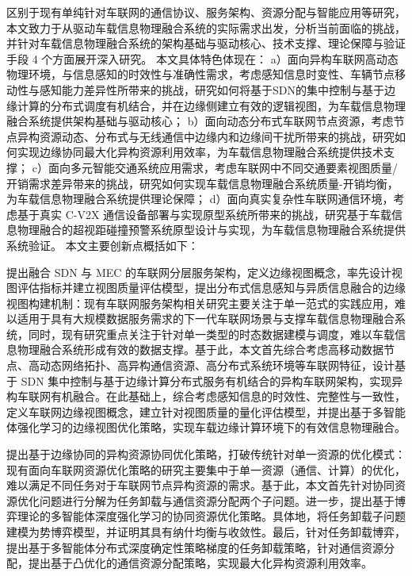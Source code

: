 区别于现有单纯针对车联网的通信协议、服务架构、资源分配与智能应用等研究，本文致力于从驱动车载信息物理融合系统的实际需求出发，分析当前面临的挑战，并针对车载信息物理融合系统的架构基础与驱动核心、技术支撑、理论保障与验证手段 4 个方面展开深入研究。
本文具体特色体现在：
a）面向异构车联网高动态物理环境，与信息感知的时效性与准确性需求，考虑感知信息时变性、车辆节点移动性与感知能力差异性所带来的挑战，研究如何将基于SDN的集中控制与基于边缘计算的分布式调度有机结合，并在边缘侧建立有效的逻辑视图，为车载信息物理融合系统提供架构基础与驱动核心；
b）面向动态分布式车联网节点资源，考虑节点异构资源动态、分布式与无线通信中边缘内和边缘间干扰所带来的挑战，研究如何实现边缘协同最大化异构资源利用效率，为车载信息物理融合系统提供技术支撑；
c）面向多元智能交通系统应用需求，考虑车联网中不同交通要素视图质量/开销需求差异带来的挑战，研究如何实现车载信息物理融合系统质量-开销均衡，为车载信息物理融合系统提供理论保障；
d）面向真实复杂性车联网通信环境，考虑基于真实 C-V2X 通信设备部署与实现原型系统所带来的挑战，研究基于车载信息物理融合的超视距碰撞预警系统原型设计与实现，为车载信息物理融合系统提供系统验证。
本文主要创新点概括如下：

 提出融合 SDN 与 MEC 的车联网分层服务架构，定义边缘视图概念，率先设计视图评估指标并建立视图质量评估模型，提出分布式信息感知与异质信息融合的边缘视图构建机制：现有车联网服务架构相关研究主要关注于单一范式的实践应用，难以适用于具有大规模数据服务需求的下一代车联网场景与支撑车载信息物理融合系统，同时，现有研究重点关注于针对单一类型的时态数据建模与调度，难以车载信息物理融合系统形成有效的数据支撑。基于此，本文首先综合考虑高移动数据节点、高动态网络拓扑、高异构通信资源、高分布式系统环境等车联网特征，设计基于 SDN 集中控制与基于边缘计算分布式服务有机结合的异构车联网架构，实现异构车联网有机融合。在此基础上，综合考虑感知信息的时效性、完整性与一致性，定义车联网边缘视图概念，建立针对视图质量的量化评估模型，并提出基于多智能体强化学习的边缘视图优化策略，实现车载边缘计算环境下的有效信息物理融合。


 提出基于边缘协同的异构资源协同优化策略，打破传统针对单一资源的优化模式：现有面向车联网资源优化策略的研究主要集中于单一资源（通信、计算）的优化，难以满足不同任务对于车联网节点异构资源的需求。基于此，本文首先针对协同资源优化问题进行分解为任务卸载与通信资源分配两个子问题。进一步，提出基于博弈理论的多智能体深度强化学习的协同资源优化策略。具体地，将任务卸载子问题建模为势博弈模型，并证明其具有纳什均衡与收敛性。最后，针对任务卸载博弈，提出基于多智能体分布式深度确定性策略梯度的任务卸载策略，针对通信资源分配，提出基于凸优化的通信资源分配策略，实现最大化异构资源利用效率。

